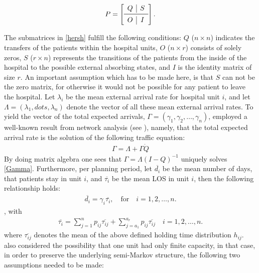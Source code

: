 \documentclass[11pt,a4paper]{article}
\begin{document}
\begin{spacing}{1.8}
\begin{align} \label{hersh}
P = 
\left[ \begin{array}{c|c}
   Q & S \\
   \midrule
   O & I \\
\end{array}\right].
\end{align}


The submatrices in \eqref{hersh} fulfill the following conditions: \(Q\) (\(n  \times n \)) indicates the transfers of the patients within the hospital units, \(O\) (\(n  \times r \))  consists of solely zeros,   \(S\) (\(r  \times n \)) represents the transitions of the patients from the inside of the hospital to the possible external absorbing states, and \(I\) is the identity matrix of size \(r\). An important assumption which has to be made here, is that \(S\) can not be the zero matrix, for otherwise it would not be possible  for any patient to leave the hospital.
Let \(\lambda_i\) be the mean external arrival rate for hospital unit \(i\), and let 
\( \Lambda = (\lambda_1, dots, \lambda_n) \) denote the vector of all these mean external arrival rates.
To yield the vector of the total expected arrivals, 
\( \Gamma = \left( \gamma_1, \gamma_2, \dots, \gamma_n \right) \), \citet{Hershey1981}
employed a well-known result from network analysis (see \citep{Kleinrock1976}), namely, that the total expected arrival rate is the solution of the following traffic equation:
\begin{align} \label{Gamma} \Gamma = \Lambda + \Gamma \dot Q \end{align}
By doing matrix algebra one sees that \(\Gamma = \Lambda {(I-Q)^{-1}}\) uniquely solves \eqref{Gamma}. Furthermore, per planning period,  let \(\overline{d_i}\) be the mean number of days, that patients stay in unit \(i\), and  \(\overline{\tau_i}\) be the mean LOS in unit \(i\), then  the following relationship holds:
\begin{align} \overline{d_i} = \gamma_i  \overline{\tau_i},\quad \text{for} \quad i=1,2, \dots, n. \end{align}, with
\begin{align} \overline{\tau_i} = \sum_{j=1}^{n} p_{ij} \overline{\tau_{ij}} + \sum_{j=a_1}^{a_r} p_{ij} \overline{\tau_{ij}}
\quad i=1,2, \dots, n. \end{align}
where \(\overline{\tau_{ij}}\) denotes the mean of the above defined holding time distribution \(h_{ij}\).
\\
\citet{Hershey1981}  also considered the possibility that one unit had only finite capacity, in that case, in order to preserve the underlying semi-Markov structure, the following two assumptions needed to be made:

\end{spacing}
\end{document}
